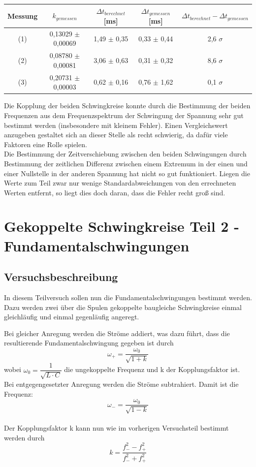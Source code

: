 \documentclass[12pt,a4paper]{article}
\begin{document}
\begin{center}
\begin{tabular}{|c|c|c|c|c|}
\hline 
Messung & $k_{gemessen}$ & $\Delta t_{berechnet}$ [ms] & $\Delta t_{gemessen}$ [ms] & $\Delta t_{berechnet} - \Delta t_{gemessen}$  \\ 
\hline 
(1) & 0,13029 $\pm$ 0,00069 & 1,49 $\pm$ 0,35 & 0,33 $\pm$ 0,44 & 2,6 $\sigma$ \\ 
\hline 
(2) & 0,08780 $\pm$ 0,00081 & 3,06 $\pm$ 0,63 & 0,31 $\pm$ 0,32 & 8,6 $\sigma$ \\ 
\hline 
(3) & 0,20731 $\pm$ 0,00003 & 0,62 $\pm$ 0,16 & 0,76 $\pm$ 1,62 & 0,1 $\sigma$ \\ 
\hline 
\end{tabular} 
\end{center}

Die Kopplung der beiden Schwingkreise konnte durch die Bestimmung der beiden Frequenzen aus dem Frequenzspektrum der Schwingung der Spannung sehr gut bestimmt werden (insbesondere mit kleinem Fehler). Einen Vergleichswert anzugeben gestaltet sich an dieser Stelle als recht schwierig, da dafür viele Faktoren eine Rolle spielen. \\
Die Bestimmung der Zeitverschiebung zwischen den beiden Schwingungen durch Bestimmung der zeitlichen Differenz zwischen einem Extremum in der einen und einer Nullstelle in der anderen Spannung hat nicht so gut funktioniert. Liegen die Werte zum Teil zwar nur wenige Standardabweichungen von den errechneten Werten entfernt, so liegt dies doch daran, dass die Fehler recht groß sind.
\newpage
\section{Gekoppelte Schwingkreise Teil 2 - Fundamentalschwingungen}
\subsection{Versuchsbeschreibung}
In diesem Teilversuch sollen nun die Fundamentalschwingungen bestimmt werden. Dazu werden zwei über die Spulen gekoppelte baugleiche Schwingkreise einmal gleichläufig und einmal gegenläufig angeregt.

Bei gleicher Anregung werden die Ströme addiert, was dazu führt, dass die resultierende Fundamentalschwingung gegeben ist durch
\begin{equation}
\omega_+ =\dfrac{\omega_0}{\sqrt{1+k}}
\end{equation}
wobei $\omega_0 = \dfrac{1}{\sqrt{L\cdot C}}$ die ungekoppelte Frequenz und k der Kopplungsfaktor ist.\\
Bei entgegengesetzter Anregung werden die Ströme subtrahiert. Damit ist die Frequenz:
\begin{equation}
\omega_- =\dfrac{\omega_0}{\sqrt{1-k}}
\end{equation}
\\
Der Kopplungsfaktor k kann nun wie im vorherigen Versuchsteil bestimmt werden durch
\begin{equation}
k = \dfrac{f_-^2 - f_+^2}{f_-^2 + f_+^2}
\label{eq:Kopplung2}
\end{equation}
\end{document}
